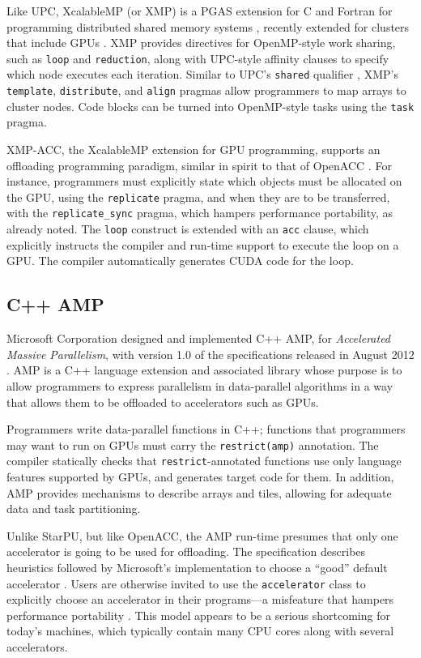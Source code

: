 \documentclass[twoside, a4paper, 10pt]{article}
\begin{document}
Like UPC, XcalableMP (or XMP) is a PGAS extension for C and Fortran for
programming distributed shared memory systems \cite{lee10:xcalablemp},
recently extended for clusters that include GPUs
\cite{lee12:xcalablemp-gpu}.  XMP provides directives for OpenMP-style
work sharing, such as \texttt{loop} and \texttt{reduction}, along with UPC-style
affinity clauses to specify which node executes each iteration.  Similar
to UPC's \texttt{shared} qualifier \cite{upc1.2-2005}, XMP's \texttt{template},
\texttt{distribute}, and \texttt{align} pragmas allow programmers to map arrays to
cluster nodes.  Code blocks can be turned into OpenMP-style tasks using
the \texttt{task} pragma.

XMP-ACC, the XcalableMP extension for GPU programming, supports an
offloading programming paradigm, similar in spirit to that of OpenACC
\cite{lee12:xcalablemp-gpu}.  For instance, programmers must explicitly
state which objects must be allocated on the GPU, using the \texttt{replicate}
pragma, and when they are to be transferred, with the \texttt{replicate\_sync}
pragma, which hampers performance portability, as already noted.  The
\texttt{loop} construct is extended with an \texttt{acc} clause, which explicitly
instructs the compiler and run-time support to execute the loop on a
GPU.  The compiler automatically generates CUDA code for the loop.
\subsection{C++ AMP}
\label{sec-4-7}


Microsoft Corporation designed and implemented C++ AMP, for \emph{Accelerated Massive Parallelism}, with version 1.0 of the specifications released in
August 2012 \cite{amp1.0:2012}.  AMP is a C++ language extension and
associated library whose purpose is to allow programmers to express
parallelism in data-parallel algorithms in a way that allows them to be
offloaded to accelerators such as GPUs.

Programmers write data-parallel functions in C++; functions that
programmers may want to run on GPUs must carry the \texttt{restrict(amp)}
annotation.  The compiler statically checks that \texttt{restrict}-annotated
functions use only language features supported by GPUs, and generates
target code for them.  In addition, AMP provides mechanisms to describe
arrays and tiles, allowing for adequate data and task partitioning.

Unlike StarPU, but like OpenACC, the AMP run-time presumes that only one
accelerator is going to be used for offloading.  The specification
describes heuristics followed by Microsoft's implementation to choose a
``good'' default accelerator \cite{amp1.0:2012}.  Users are otherwise
invited to use the \texttt{accelerator} class to explicitly choose an
accelerator in their programs---a misfeature that hampers performance
portability \cite{AugThiNamWac09Europar}.  This model appears to be a
serious shortcoming for today's machines, which typically contain many CPU
cores along with several accelerators.
\end{document}
